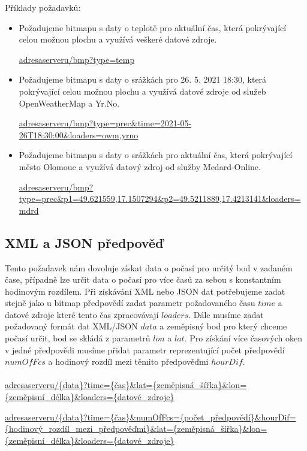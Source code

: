 \documentclass[czech,bachelor,dept460,male,csharp,cpdeclaration]{diploma}
\begin{document}
	Příklady požadavků:
	\begin{itemize}
		\item Požadujeme bitmapu s daty o teplotě pro aktuální čas, která pokrývající celou možnou plochu a využívá veškeré datové zdroje.
		
		\url{adresaserveru/bmp?type=temp}
		
		\item Požadujeme bitmapu s daty o srážkách pro 26. 5. 2021 18:30, která pokrývající celou možnou plochu a využívá datové zdroje od služeb OpenWeatherMap a Yr.No.
		
		\url{adresaserveru/bmp?type=prec\&time=2021-05-26T18:30:00\&loaders=owm,yrno}
		
		\item Požadujeme bitmapu s daty o srážkách pro aktuální čas, která pokrývající město Olomouc a využívá datový zdroj od služby Medard-Online.
		
		\url{adresaserveru/bmp?type=prec\&p1=49.621559,17.1507294\&p2=49.5211889,17.4213141\&loaders=mdrd}
	\end{itemize}
	
	\subsection{XML a JSON předpověď}
	
	Tento požadavek nám dovoluje získat data o počasí pro určitý bod v zadaném čase, případně lze určit data o počasí pro více časů za sebou s konstantním hodinovým rozdílem. Při získávání XML nebo JSON dat potřebujeme zadat stejně jako u bitmap předpovědí zadat parametr požadovaného času $time$ a datové zdroje které tento čas zpracovávají $loaders$. Dále musíme zadat požadovaný formát dat XML/JSON $data$ a zeměpisný bod pro který chceme počasí určit, bod se skládá z parametrů $lon$ a $lat$. Pro získání více časových oken v jedné předpovědi musíme přidat parametr reprezentující počet předpovědí $numOfFcs$ a hodinový rozdíl mezi těmito předpověďmi $hourDif$.
	\\\\
	\url{adresaserveru/{data}?time={čas}\&lat={zeměpisná\_šířka}\&lon={zeměpisní\_délka}\&loaders={datové\_zdroje}}
	
	\begin{flushleft}
		\url{adresaserveru/{data}?time={čas}\&numOfFcs={počet\_předpovědí}\&hourDif={hodinový\_rozdíl\_mezi\_předpověďmi}\&lat={zeměpisná\_šířka}\&lon={zeměpisní\_délka}\&loaders={datové\_zdroje}}
	\end{flushleft}
	
\end{document}
